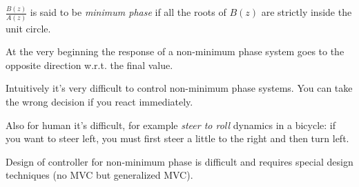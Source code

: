 \begin{rem}
    $\frac{B(z)}{A(z)}$ is said to be \emph{minimum phase} if all the roots of $B(z)$ are strictly inside the unit circle.

    \begin{figure}[H]
        \centering
    \end{figure}

    At the very beginning the response of a non-minimum phase system goes to the opposite direction w.r.t. the final value.


    Intuitively it's very difficult to control non-minimum phase systems.
    You can take the wrong decision if you react immediately.

    Also for human it's difficult, for example \emph{steer to roll} dynamics in a bicycle: if you want to steer left, you must first steer a little to the right and then turn left.

    Design of controller for non-minimum phase is difficult and requires special design techniques (no MVC but generalized MVC).
\end{rem}

